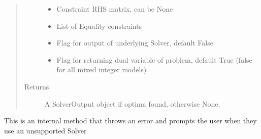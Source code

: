 \documentclass[letterpaper,10pt,english]{sphinxmanual}
\begin{document}
\begin{fulllineitems}
\begin{fulllineitems}
\begin{quote}
\begin{description}
\begin{itemize}
\item {} 
\sphinxAtStartPar
{} \textendash{} Constraint RHS matrix, can be None

\item {} 
\sphinxAtStartPar
{} \textendash{} List of Equality constraints

\item {} 
\sphinxAtStartPar
{} \textendash{} Flag for output of underlying Solver, default False

\item {} 
\sphinxAtStartPar
{} \textendash{} Flag for returning dual variable of problem, default True (false for all mixed integer models)

\end{itemize}

\item[{Returns}] \leavevmode
\sphinxAtStartPar
A SolverOutput object if optima found, otherwise None.

\end{description}\end{quote}

\end{fulllineitems}


\begin{fulllineitems}
\label{\detokenize{ppopt:ppopt.solver.Solver.solver_not_supported}}
\sphinxAtStartPar
This is an internal method that throws an error and prompts the user when they use an unsupported Solver

\end{fulllineitems}


\begin{fulllineitems}
\label{\detokenize{ppopt:ppopt.solver.Solver.solvers}}
\end{fulllineitems}


\end{fulllineitems}
\end{document}
